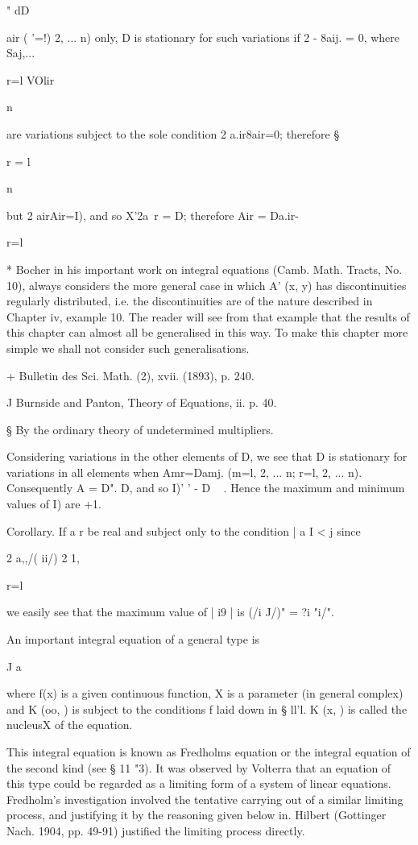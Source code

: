 " dD

air ( '=!) 2, ... n) only, D is stationary for such variations if 2 -
8aij. = 0, where Saj,...

r=l VOlir

n

are variations subject to the sole condition 2 a.ir8air=0; therefore
§

r = l

n

but 2 airAir=I), and so X'2a\ r = D; therefore Air = Da.ir-

r=l

* Bocher in his important work on integral equations (Camb. Math.
Tracts, No. 10), always considers the more general case in which A'
(x, y) has discontinuities regularly distributed, i.e. the
discontinuities are of the nature described in Chapter iv, example 10.
The reader will see from that example that the results of this chapter
can almost all be generalised in this way. To make this chapter more
simple we shall not consider such generalisations.

+ Bulletin des Sci. Math. (2), xvii. (1893), p. 240.

J Burnside and Panton, Theory of Equations, ii. p. 40.

§ By the ordinary theory of undetermined multipliers.

%
%

Considering variations in the other elements of D, we see that D is
stationary for variations in all elements when Amr=Damj. (m=l, 2, ...
n; r=l, 2, ... n). Consequently A = D". D, and so I)' ' - D ~ . Hence
the maximum and minimum values of I) are +1.

Corollary. If a r be real and subject only to the condition | a I < j
since

2 a,,/( ii/) 2 1,

r=l

we easily see that the maximum value of | i9 | is (/i J/)" = ?i "i/".

An important
integral equation of a general type is

J a

where f(x) is a given continuous function, X is a parameter (in
general complex) and K (oo, ) is subject to the conditions f laid down
in § ll'l. K (x, ) is called the nucleusX of the equation.

This integral equation is known as Fredholms equation or the integral
equation of the second kind (see § 11 "3). It was observed by Volterra
that an equation of this type could be regarded as a limiting form of
a system of linear equations. Fredholm's investigation involved the
tentative carrying out of a similar limiting process, and justifying
it by the reasoning given below in. Hilbert (Gottinger Nach.
1904, pp. 49-91) justified the limiting process directly.

